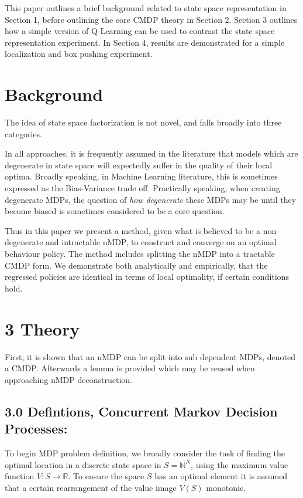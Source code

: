 \documentclass[compsoc,journal,letterpaper,10pt,draftclsnofoot,onecolumn]{IEEEtran}
\begin{document}
This paper outlines a brief background related to state space
representation in Section 1, before outlining the core CMDP theory in
Section 2. Section 3 outlines how a simple version of Q-Learning can be
used to contrast the state space representation experiment. In Section
4, results are demonstrated for a simple localization and box pushing
experiment.

\section{Background}\label{background}

The idea of state space factorization is not novel, and falls broadly
into three categories.

In all approaches, it is frequently assumed in the literature that
models which are degenerate in state space will expectedly suffer in the
quality of their local optima. Broadly speaking, in Machine Learning
literature, this is sometimes expressed as the Bias-Variance trade off.
Practically speaking, when creating degenerate MDPs, the question of
\emph{how degenerate} these MDPs may be until they become biased is
sometimes considered to be a core question.

Thus in this paper we present a method, given what is believed to be a
non-degenerate and intractable nMDP, to construct and converge on an
optimal behaviour policy. The method includes splitting the nMDP into a
tractable CMDP form. We demonstrate both analytically and empirically,
that the regressed policies are identical in terms of local optimality,
if certain conditions hold.

\section{3 Theory}\label{theory}

First, it is shown that an nMDP can be split into sub dependent MDPs,
denoted a CMDP. Afterwards a lemma is provided which may be reused when
approaching nMDP deconstruction.

\subsection{3.0 Defintions, Concurrent Markov Decision
Processes:}\label{defintions-concurrent-markov-decision-processes}

To begin MDP problem definition, we broadly consider the task of finding
the optimal location in a discrete state space in
\(S = \mathbb{N}^{N}\), using the maximum value function
\(V:S\rightarrow\mathbb{R}\). To ensure the space \(S\) has an
optimal element it is assumed that a certain rearrangement of the value
image \(V\left( S \right)\) monotonic.
\end{document}
